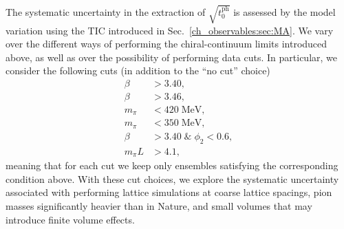 The systematic uncertainty in the extraction of $\sqrt{t_0^{\textrm{ph}}}$ is assessed by the model variation using the TIC introduced in Sec.~\ref{ch_observables:sec:MA}. We vary over the different ways of performing the chiral-continuum limits introduced above, as well as over the possibility of performing data cuts. In particular, we consider the following cuts (in addition to the ``no cut'' choice)
\begin{align}
\label{ch_ss:eq:cuts}
\beta&>3.40, \\
\beta&>3.46, \\
m_{\pi}&<420\;\textrm{MeV}, \\
m_{\pi}&<350\;\textrm{MeV}, \\
\beta&>3.40\;\&\;\phi_2<0.6, \\
m_{\pi}L&>4.1,
\end{align}
meaning that for each cut we keep only ensembles satisfying the corresponding condition above. With these cut choices, we explore the systematic uncertainty associated with performing lattice simulations at coarse lattice spacings, pion masses significantly heavier than in Nature, and small volumes that may introduce finite volume effects.

